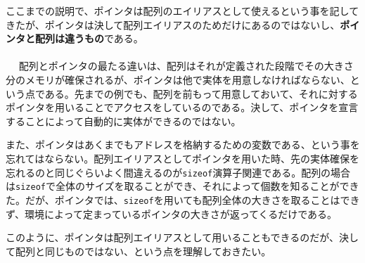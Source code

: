 ここまでの説明で、ポインタは配列のエイリアスとして使えるという事を記してきたが、ポインタは決して配列エイリアスのためだけにあるのではないし、\textbf{ポインタと配列は違うもの}である。
\\ \\　
配列とポインタの最たる違いは、配列はそれが定義された段階でその大きさ分のメモリが確保されるが、ポインタは他で実体を用意しなければならない、という点である。先までの例でも、配列を前もって用意しておいて、それに対するポインタを用いることでアクセスをしているのである。決して、ポインタを宣言することによって自動的に実体ができるのではない。

また、ポインタはあくまでもアドレスを格納するための変数である、という事を忘れてはならない。配列エイリアスとしてポインタを用いた時、先の実体確保を忘れるのと同じぐらいよく間違えるのが\verb|sizeof|演算子関連である。配列の場合は\verb|sizeof|で全体のサイズを取ることができ、それによって個数を知ることができた。だが、ポインタでは、\verb|sizeof|を用いても配列全体の大きさを取ることはできず、環境によって定まっているポインタの大きさが返ってくるだけである。

このように、ポインタは配列エイリアスとして用いることもできるのだが、決して配列と同じものではない、という点を理解しておきたい。

